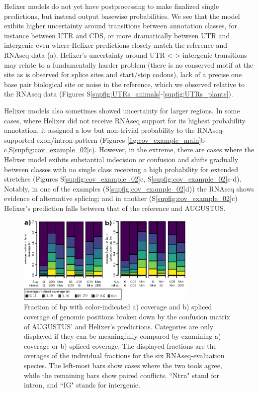 \documentclass{bioinfo}
\newcounter{supfig}
\begin{document}
Helixer models do not yet have postprocessing
to make finalized single predictions, but instead output basewise probabilities.
We see that the model exibits higher uncertainty around transitions between annotation 
classes, for instance between UTR and CDS, or more dramatically between UTR and 
intergenic even where Helixer predictions closely match the reference and RNAseq data (a). 
Helixer's uncertainty around UTR <-> intergenic transitions may relate to a
fundamentally harder problem (there is no conserved motif at the site as is observed
for splice sites and start/stop codons), lack of a precise one 
base pair biological site \citep{carninci2006genome,hon2013quantification}
or noise in the reference, which we observed relative to the RNAseq data 
(Figures S\ref{supfig:UTRs_animals}-\ref{supfig:UTRs_plants}). %

Helixer models also sometimes showed uncertainty for larger regions.
In some cases, where Helixer did not receive RNAseq support for its highest probability
annotation, it assigned a low but non-trivial probability to the RNAseq-supported 
exon/intron pattern (Figures \ref{fig:cov_example_main}b-c,S\ref{supfig:cov_example_02}c). However, in the extreme,
there are cases where the Helixer model exibits substantial indecision or confusion 
and shifts gradually between classes with no single class receiving a high probability 
for extended stretches (Figures S\ref{supfig:cov_example_02}c, S\ref{supfig:cov_example_02}c-d). 
Notably, in one of the examples (S\ref{supfig:cov_example_02}d))
the RNAseq shows evidence of alternative splicing; 
and in another (S\ref{supfig:cov_example_02}c) Helixer's
prediction falls between that of the reference and AUGUSTUS.

\begin{figure}[hbt]
\label{fig:average_vs_augustus}
\includegraphics[width=8.6cm]{images/cov_examples/average_vs_augustus}  %
\caption{Fraction of bp with color-indicated a) coverage and b) spliced coverage of genomic positions 
broken down by the confusion matrix of AUGUSTUS' and Helixer's predictions. Categories 
are only displayed if they can be meaningfully compared by examining a) coverage or b) spliced
coverage. The displayed fractions are the averages of the individual fractions for the 
six RNAseq-evaluation species. The left-most bars show cases where the two tools agree, 
while the remaining bars show paired conflicts. ``Ntrn" stand
for intron, and ``IG" stands for intergenic.}
\end{figure}
\end{document}
